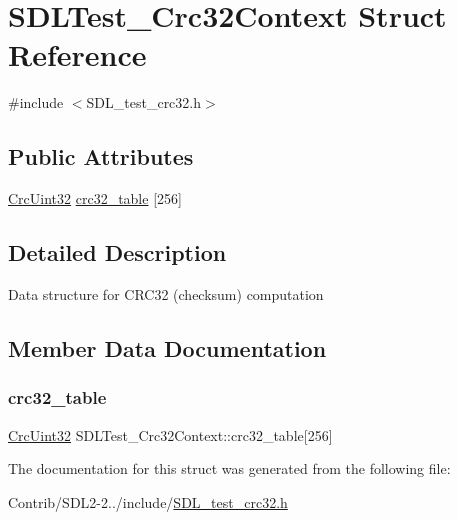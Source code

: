 \hypertarget{struct_s_d_l_test___crc32_context}{}\section{S\+D\+L\+Test\+\_\+\+Crc32\+Context Struct Reference}
\label{struct_s_d_l_test___crc32_context}


{\ttfamily \#include $<$S\+D\+L\+\_\+test\+\_\+crc32.\+h$>$}

\subsection*{Public Attributes}
\begin{DoxyCompactItemize}
\item 
\mbox{\hyperlink{_s_d_l__test__crc32_8h_ac0e8fe38fa91e9aa4b32957420795387}{Crc\+Uint32}} \mbox{\hyperlink{struct_s_d_l_test___crc32_context_ae95d0d0b48bafc4e2f6f032f754ffa4c}{crc32\+\_\+table}} \mbox{[}256\mbox{]}
\end{DoxyCompactItemize}


\subsection{Detailed Description}
Data structure for C\+R\+C32 (checksum) computation 

\subsection{Member Data Documentation}
\mbox{\label{struct_s_d_l_test___crc32_context_ae95d0d0b48bafc4e2f6f032f754ffa4c}} 
\subsubsection{\texorpdfstring{crc32\+\_\+table}{crc32\_table}}
{\footnotesize\ttfamily \mbox{\hyperlink{_s_d_l__test__crc32_8h_ac0e8fe38fa91e9aa4b32957420795387}{Crc\+Uint32}} S\+D\+L\+Test\+\_\+\+Crc32\+Context\+::crc32\+\_\+table\mbox{[}256\mbox{]}}



The documentation for this struct was generated from the following file\+:\begin{DoxyCompactItemize}
\item 
Contrib/\+S\+D\+L2-\/2../include/\mbox{\hyperlink{_s_d_l__test__crc32_8h}{S\+D\+L\+\_\+test\+\_\+crc32.\+h}}\end{DoxyCompactItemize}
